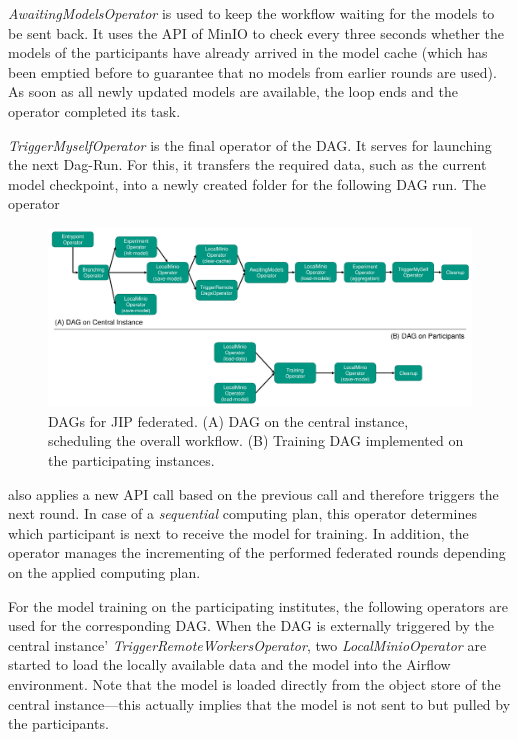 \textit{AwaitingModelsOperator} is used to keep the workflow waiting for the models to be sent back. It uses the API of MinIO to check every three seconds whether the models of the participants have already arrived in the model cache (which has been emptied before to guarantee that no models from earlier rounds are used). As soon as all newly updated models are available, the loop ends and the operator completed its task.

\textit{TriggerMyselfOperator} is the final operator of the DAG.
It serves for launching the next Dag-Run. For this, it transfers the required data, such as the current model checkpoint, into a newly created folder for the following DAG run. The operator

\begin{figure}
    \centerline{\includegraphics[width=1\textwidth]{1_Figures/DAG_KaapanaFed.pdf}}
    \caption[DAGs of JIP Federated on the central instance and the participants]{DAGs for JIP federated. (A) DAG on the central instance, scheduling the overall workflow. (B) Training DAG implemented on the participating instances.}
\label{fig:DAG_KaapanaFed}
\end{figure}

also applies a new API call based on the previous call and therefore triggers the next round. In case of a \textit{sequential} computing plan, this operator determines which participant is next to receive the model for training. In addition, the operator manages the incrementing of the performed federated rounds depending on the applied computing plan.

For the model training on the participating institutes, the following operators are used for the corresponding DAG.
When the DAG is externally triggered by the central instance' \textit{TriggerRemoteWorkersOperator}, two \textit{LocalMinioOperator} are started to load the locally available data and the model into the Airflow environment. Note that the model is loaded directly from the object store of the central instance---this actually implies that the model is not sent to but pulled by the participants.

